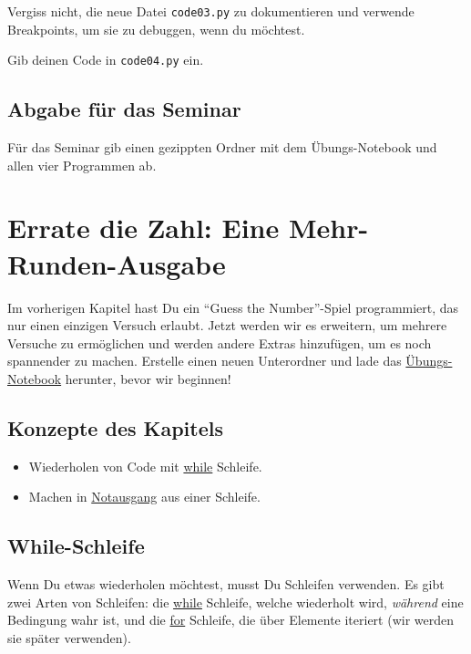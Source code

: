 \documentclass[
]{book}
\providecommand{\tightlist}{%
  \setlength{\itemsep}{0pt}\setlength{\parskip}{0pt}}
\begin{document}
Vergiss nicht, die neue Datei \texttt{code03.py} zu dokumentieren und verwende Breakpoints, um sie zu debuggen, wenn du möchtest.

Gib deinen Code in \texttt{code04.py} ein.

\hypertarget{abgabe-fuxfcr-das-seminar}{%
\section{Abgabe für das Seminar}\label{abgabe-fuxfcr-das-seminar}}

Für das Seminar gib einen gezippten Ordner mit dem Übungs-Notebook und allen vier Programmen ab.

\hypertarget{guess-the-number-multi-round}{%
\chapter{Errate die Zahl: Eine Mehr-Runden-Ausgabe}\label{guess-the-number-multi-round}}

Im vorherigen Kapitel hast Du ein ``Guess the Number''-Spiel programmiert, das nur einen einzigen Versuch erlaubt. Jetzt werden wir es erweitern, um mehrere Versuche zu ermöglichen und werden andere Extras hinzufügen, um es noch spannender zu machen. Erstelle einen neuen Unterordner und lade das \href{notebooks/Guess\%20the\%20number\%20-\%20multi\%20round.ipynb}{Übungs-Notebook} herunter, bevor wir beginnen!

\hypertarget{konzepte-des-kapitels-2}{%
\section{Konzepte des Kapitels}\label{konzepte-des-kapitels-2}}

\begin{itemize}
\tightlist
\item
  Wiederholen von Code mit \protect\hyperlink{while-loop}{while} Schleife.
\item
  Machen in \protect\hyperlink{break}{Notausgang} aus einer Schleife.
\end{itemize}

\hypertarget{while-loop}{%
\section{While-Schleife}\label{while-loop}}

Wenn Du etwas wiederholen möchtest, musst Du Schleifen verwenden. Es gibt zwei Arten von Schleifen: die \href{https://docs.python.org/3/reference/compound_stmts.html\#the-while-statement}{while} Schleife, welche wiederholt wird, \emph{während} eine Bedingung wahr ist, und die \href{https://docs.python.org/3/reference/compound_stmts.html\#the-for-statement}{for} Schleife, die über Elemente iteriert (wir werden sie später verwenden).
\end{document}
